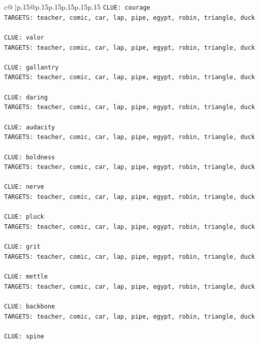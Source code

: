 \documentclass{article}
\begin{document}
{\begin{supertabular}{c@{$\;$}|p{.15\linewidth}@{}p{.15\linewidth}p{.15\linewidth}p{.15\linewidth}p{.15\linewidth}p{.15\linewidth}}
{{{\texttt{CLUE: courage} \\
\texttt{TARGETS: teacher, comic, car, lap, pipe, egypt, robin, triangle, duck} \\
\\ 
\texttt{CLUE: valor} \\
\texttt{TARGETS: teacher, comic, car, lap, pipe, egypt, robin, triangle, duck} \\
\\ 
\texttt{CLUE: gallantry} \\
\texttt{TARGETS: teacher, comic, car, lap, pipe, egypt, robin, triangle, duck} \\
\\ 
\texttt{CLUE: daring} \\
\texttt{TARGETS: teacher, comic, car, lap, pipe, egypt, robin, triangle, duck} \\
\\ 
\texttt{CLUE: audacity} \\
\texttt{TARGETS: teacher, comic, car, lap, pipe, egypt, robin, triangle, duck} \\
\\ 
\texttt{CLUE: boldness} \\
\texttt{TARGETS: teacher, comic, car, lap, pipe, egypt, robin, triangle, duck} \\
\\ 
\texttt{CLUE: nerve} \\
\texttt{TARGETS: teacher, comic, car, lap, pipe, egypt, robin, triangle, duck} \\
\\ 
\texttt{CLUE: pluck} \\
\texttt{TARGETS: teacher, comic, car, lap, pipe, egypt, robin, triangle, duck} \\
\\ 
\texttt{CLUE: grit} \\
\texttt{TARGETS: teacher, comic, car, lap, pipe, egypt, robin, triangle, duck} \\
\\ 
\texttt{CLUE: mettle} \\
\texttt{TARGETS: teacher, comic, car, lap, pipe, egypt, robin, triangle, duck} \\
\\ 
\texttt{CLUE: backbone} \\
\texttt{TARGETS: teacher, comic, car, lap, pipe, egypt, robin, triangle, duck} \\
\\ 
\texttt{CLUE: spine} \\
}}}
\end{supertabular}}
\end{document}
